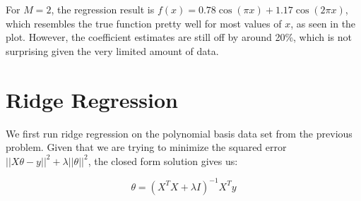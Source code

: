 \documentclass[8pt]{article}
\begin{document}
For $M = 2$, the regression result is $f(x) = 0.78 \cos(\pi x) + 1.17 \cos(2\pi x)$, which resembles the true function pretty well for most values of $x$, as seen in the plot. However, the coefficient estimates are still off by around 20\%, which is not surprising given the very limited amount of data.


\section{Ridge Regression}

We first run ridge regression on the polynomial basis data set from the previous problem. Given that we are trying to minimize the squared error  $\vert \vert X\theta - y\vert \vert ^2 + \lambda \vert \vert \theta \vert \vert ^2$, the closed form solution gives us:

\[  \theta = (X^{T}X + \lambda I)^{-1} X^{T} y \]
\end{document}
